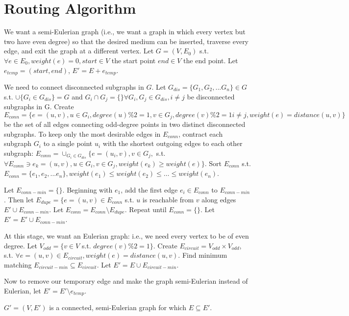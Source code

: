\newpage
\appendix

\section{Routing Algorithm}

We want a semi-Eulerian graph (i.e., we want a graph in which every vertex but two have even degree) so that the desired medium can be inserted, traverse every edge, and exit the graph at a different vertex.  Let $G=(V,E_0)$ s.t. $\forall e \in E_0, weight(e)=0, start \in V $ the start point $end \in V$ the end point.  Let $e_{temp} = (start, end)$, $E' = E + e_{temp}$.

We need to connect disconnected subgraphs in $G$.  Let $G_{dis} = \{G_1, G_2, ... G_n\} \in G$ s.t. $\cup{\{G_i \in G_{dis}\}} = G$ and $G_i \cap G_j  = \{ \} \forall G_i, G_j \in G_{dis}, i\neq j$ be disconnected subgraphs in G.  Create $E_{conn} = \{e = (u, v), u \in G_i, degree(u)\%2 = 1, v \in G_j, degree(v) \%2 = 1 i \neq j, weight(e) = distance(u, v)\}$ be the set of all edges connecting odd-degree points in two distinct disconnected subgraphs.  To keep only the most desirable edges in $E_{conn}$, contract each subgraph $G_i$ to a single point $u_i$ with the shortest outgoing edges to each other subgraph: $E_{conn} = \cup_{G_i \in G_{dis}} \{e=(u_i, v), v \in G_j,$ s.t. $\forall E_{conn} \ni e_k = (u, v), u \in G_i, v \in G_j, weight(e_k) \geq weight(e)\}$.  Sort $E_{conn}$ s.t. $E_{conn} = \{e_1, e_2, ... e_n\}, weight(e_1) \leq weight(e_2) \leq \ldots \leq weight(e_n)$.

Let $E_{conn-min} = \{ \}$.  Beginning with $e_1$, add the first edge $e_i \in E_{conn}$ to $E_{conn-min}$.  Then let $E_{dupe} = \{ e = (u, v) \in E_{conn}$ s.t. $u$  is reachable from $v$ along edges $E' \cup E_{conn-min}$.  Let $E_{conn} = E_{conn} \setminus E_{dupe}$.  Repeat until $E_{conn} = \{ \}$.  Let $E' = E' \cup E_{conn-min}$.

At this stage, we want an Eulerian graph: i.e., we need every vertex to be of even degree.  Let $V_{odd} = \{ v \in V$ s.t. $degree(v) \% 2 = 1 \}$.  Create $E_{circuit} = V_{odd} \times V_{odd}$, s.t. $\forall e=(u,v) \in E_{circuit}, weight(e) = distance(u, v)$.  Find minimum matching $E_{circuit-min} \subseteq E_{circuit}$.  Let $E' = E \cup E_{circuit-min}$.

Now to remove our temporary edge and make the graph semi-Eulerian instead of Eulerian, let $E' = E' \setminus e_{temp}$.

\begin{theorem} \label{thm:graphness}
 $G' = (V, E')$ is a connected, semi-Eulerian graph for which $E \subseteq E'$.
\end{theorem}

